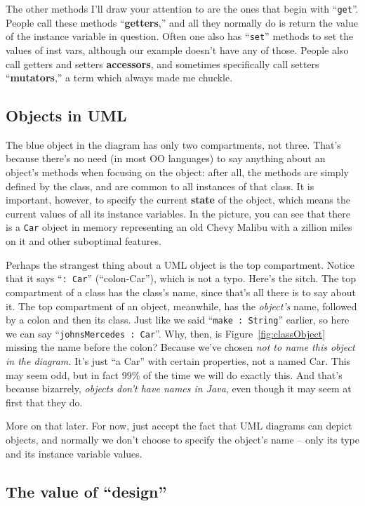 The other methods I'll draw your attention to are the ones that begin with
``\texttt{get}''. People call these methods ``\textbf{getters},'' and all they
normally do is return the value of the instance variable in question. Often
one also has ``\texttt{set}'' methods to set the values of inst vars, although
our example doesn't have any of those. People also call getters and setters
\textbf{accessors}, and sometimes specifically call setters
``\textbf{mutators},'' a term which always made me chuckle.

\subsection{Objects in UML}

The blue object in the diagram has only two compartments, not three. That's
because there's no need (in most OO languages) to say anything about an
object's methods when focusing on the object: after all, the methods are
simply defined by the class, and are common to all instances of that class. It
is important, however, to specify the current \textbf{state} of the object,
which means the current values of all its instance variables. In the picture,
you can see that there is a \texttt{Car} object in memory representing an old
Chevy Malibu with a zillion miles on it and other suboptimal features.

Perhaps the strangest thing about a UML object is the top compartment. Notice
that it says ``\texttt{:~Car}'' (``colon-Car''), which is not a typo. Here's the
sitch. The top compartment of a class has the class's name, since that's all
there is to say about it. The top compartment of an object, meanwhile, has the
\textit{object's} name, followed by a colon and then its class. Just like we
said ``\texttt{make :~String}'' earlier, so here we can say
``\texttt{johnsMercedes :~Car}''. Why, then, is Figure~\ref{fig:classObject}
missing the name before the colon? Because we've chosen \textit{not to name
this object in the diagram.} It's just ``a Car'' with certain properties, not a
named Car. This may seem odd, but in fact 99\% of the time we will do exactly
this. And that's because bizarrely, \textit{objects don't have names in Java},
even though it may seem at first that they do.

More on that later. For now, just accept the fact that UML diagrams can depict
objects, and normally we don't choose to specify the object's name -- only its
type and its instance variable values.


\subsection{The value of ``design''}

